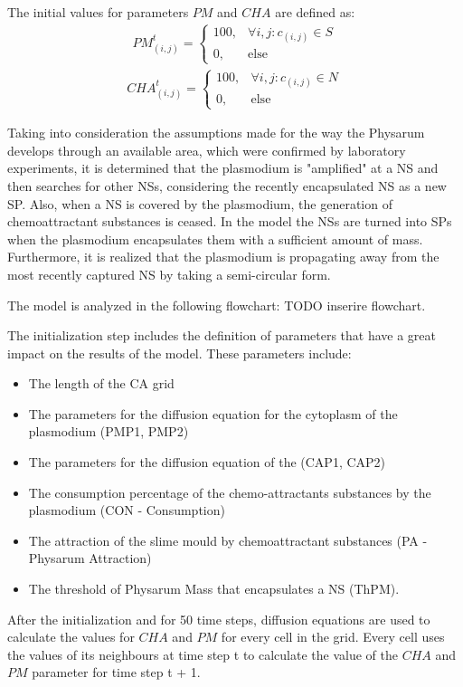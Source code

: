 The initial values for parameters $PM$ and $CHA$ are defined as:
\begin{align}
PM^t_{(i, j)}=\begin{cases} 100, & \forall i, j: c_{(i,j)} \in S \\ 0, & \mbox{else}\end{cases}
\end{align}
\begin{align}
CHA^t_{(i, j)}=\begin{cases} 100, & \forall i, j: c_{(i,j)} \in N \\ 0, & \mbox{else}\end{cases}
\end{align}

Taking into consideration the assumptions made for the way the Physarum develops through an available area, which were confirmed by laboratory experiments, it is determined that the plasmodium is "amplified" at a NS and then searches for other NSs, considering the recently encapsulated NS as a new SP. Also, when a NS is covered by the plasmodium, the generation of chemoattractant substances is ceased.
In the model the NSs are turned into SPs when the plasmodium encapsulates them with a sufficient amount of mass. Furthermore, it is realized that the plasmodium is propagating away from the most recently captured NS by taking a semi-circular form. 
\par
The model is analyzed in the following flowchart: TODO inserire flowchart.
\par
The initialization step includes the definition of parameters that have a great impact on the results of the model. These parameters include:
\begin{itemize}
	\item The length of the CA grid
	\item The parameters for the diffusion equation for the cytoplasm of the plasmodium (PMP1, PMP2)
	\item The parameters for the diffusion equation of the  (CAP1, CAP2)
	\item The consumption percentage of the chemo-attractants substances by the plasmodium (CON - Consumption)
	\item The attraction of the slime mould by chemoattractant substances (PA - Physarum Attraction)
	\item The threshold of Physarum Mass that encapsulates a NS (ThPM).
\end{itemize}
\par
After the initialization and for 50 time steps, diffusion equations are used to calculate the values for $CHA$ and $PM$ for every cell in the grid. Every cell uses the values of its neighbours at time step t to calculate the value of the $CHA$ and $PM$ parameter for time step t + 1. 
